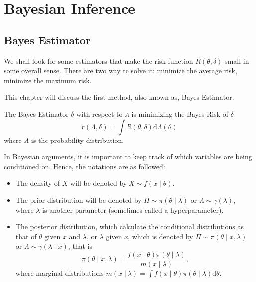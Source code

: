\chapter{Bayesian Inference}

\section{Bayes Estimator}

We shall look for some estimators that make the risk function $R\left(\theta,\delta\right)$ small in some overall sense. There are two way to solve it: minimize the average risk, minimize the maximum risk.

This chapter will discuss the first method, also known as, Bayes Estimator.

\begin{definition} \label{def:bayes-estimator}
	The Bayes Estimator $\delta$ with respect to $\Lambda$ is minimizing the Bayes Risk of $\delta$
	\begin{equation}
		r\left(\Lambda, \delta\right)=\int R\left(\theta, \delta\right) \mathrm{d} \Lambda\left(\theta\right)
	\end{equation}
	where $\Lambda$ is the probability distribution.
\end{definition}

In Bayesian arguments, it is important to keep track of which variables are being conditioned on. Hence, the notations are as followed:
\begin{itemize}
	\item The density of $X$ will be denoted by $X \sim f\left(x \mid \theta\right)$.
	\item The prior distribution will be denoted by $\Pi \sim \pi\left(\theta \mid \lambda\right)$ or $\Lambda \sim \gamma\left(\lambda\right)$, where $\lambda$ is another parameter (sometimes called a hyperparameter).
	\item The posterior distribution, which calculate the conditional distributions as that of $\theta$ given $x$ and $\lambda$, or $\lambda$ given $x$, which is denoted by $\Pi \sim \pi\left(\theta \mid x, \lambda\right)$ or $\Lambda \sim \gamma\left(\lambda \mid x\right)$, that is
	      \begin{equation}
		      \pi\left(\theta \mid x, \lambda\right) = \frac{f\left(x \mid \theta\right) \pi\left(\theta \mid \lambda\right)}{m\left(x \mid \lambda\right)},
	      \end{equation}
	      where marginal distributions $m\left(x \mid \lambda\right) = \int f\left(x \mid \theta\right) \pi\left(\theta \mid \lambda\right) \mathrm{d} \theta$.
\end{itemize}

